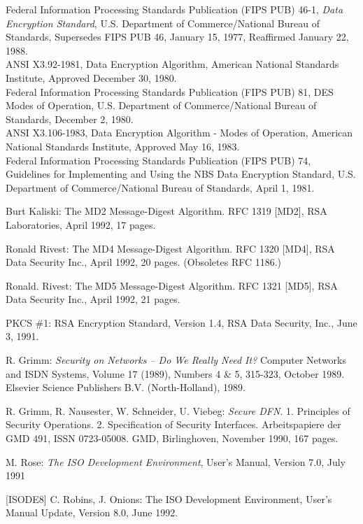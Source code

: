 \begin{thebibliography}{99}
Federal Information  Processing Standards Publication  (FIPS
PUB)   46-1, {\em Data  Encryption Standard},  U.S. Department  of
Commerce/National Bureau  of Standards, Supersedes  FIPS PUB
46,  January 15, 1977, Reaffirmed January 22, 1988. \\ [1ex]
ANSI   X3.92-1981,  Data   Encryption  Algorithm,   American
National  Standards Institute, Approved December 30, 1980. \\ [1ex]
Federal Information  Processing Standards  Publication (FIPS
PUB)    81,  DES  Modes  of Operation,  U.S.  Department  of
Commerce/National Bureau of Standards, December 2, 1980. \\ [1ex]
ANSI  X3.106-1983,  Data  Encryption  Algorithm -  Modes  of
Operation, American  National Standards  Institute, Approved
May  16, 1983. \\ [1ex]
Federal Information  Processing Standards  Publication (FIPS
PUB)  74, Guidelines for Implementing and Using the NBS Data
Encryption  Standard, U.S.  Department of  Commerce/National
Bureau of Standards, April 1, 1981.

Burt Kaliski:
The MD2 Message-Digest Algorithm.
RFC 1319 [MD2], RSA Laboratories, April 1992, 17 pages.

Ronald Rivest:
The MD4 Message-Digest Algorithm.
RFC 1320 [MD4], RSA Data Security Inc., April 1992, 20 pages.
(Obsoletes RFC 1186.)

Ronald. Rivest:
The MD5 Message-Digest Algorithm.
RFC 1321 [MD5], RSA Data Security Inc., April 1992, 21 pages.

PKCS \#1: RSA Encryption Standard, Version 1.4,
RSA Data Security, Inc., June 3, 1991.

R. Grimm:
{\em Security on Networks -- Do We Really Need It?}
Computer Networks and ISDN Systems,
Volume 17 (1989), Numbers 4 \& 5, 315-323, October 1989.
Elsevier Science Publishers B.V. (North-Holland), 1989.

R. Grimm, R. Nausester, W. Schneider, U. Viebeg:
{\em Secure DFN}.
1. Principles of Security Operations.
2. Specification of Security Interfaces.
Arbeitspapiere der GMD 491, ISSN 0723-05008.
GMD, Birlinghoven, November 1990, 167 pages.

M. Rose: {\em The ISO Development Environment}, User's Manual, Version 7.0, July 1991

\item{[ISODE8]}
C. Robins, J. Onions: The ISO Development Environment, User's Manual Update, Version 8.0, June 1992.


\end{thebibliography}
